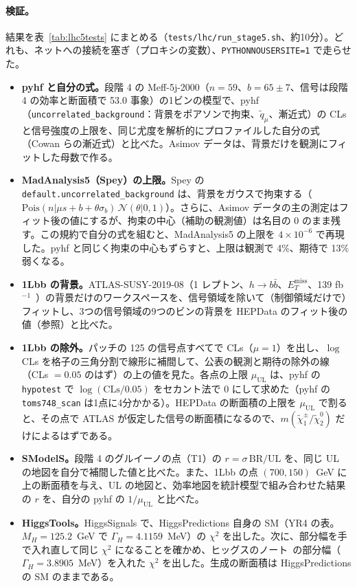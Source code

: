 \documentclass[a4paper,10pt]{ltjsarticle}
\begin{document}
\paragraph{検証。}結果を表~\ref{tab:lhc5tests} にまとめる（\nolinkurl{tests/lhc/run_stage5.sh}、約10分）。どれも、ネットへの接続を塞ぎ（プロキシの変数）、\texttt{PYTHONNOUSERSITE=1} で走らせた。
\begin{itemize}
\item \textbf{pyhf と自分の式。}段階 4 の Meff-5j-2000（$n=59$、$b=65\pm7$、信号は段階 4 の効率と断面積で 53.0 事象）の1ビンの模型で、pyhf（\texttt{uncorrelated\_background}：背景をポアソンで拘束、$\tilde q_\mu$、漸近式）の CLs と信号強度の上限を、同じ尤度を解析的にプロファイルした自分の式（Cowan らの漸近式）と比べた。Asimov データは、背景だけを観測にフィットした母数で作る。
\item \textbf{MadAnalysis5（Spey）の上限。}Spey の \texttt{default.uncorrelated\_background} は、背景をガウスで拘束する（$\mathrm{Pois}(n|\mu s+b+\theta\sigma_b)\,\mathcal N(\theta|0,1)$）。さらに、Asimov データの主の測定はフィット後の値にするが、拘束の中心（補助の観測値）は名目の 0 のまま残す。この規約で自分の式を組むと、MadAnalysis5 の上限を $4\times10^{-6}$ で再現した。pyhf と同じく拘束の中心もずらすと、上限は観測で 4\%、期待で 13\% 弱くなる。
\item \textbf{1Lbb の背景。}ATLAS-SUSY-2019-08（1 レプトン、$h\to b\bar b$、$E_T^{\mathrm{miss}}$、139 fb$^{-1}$~\cite{atlas1lbb}）の背景だけのワークスペースを、信号領域を除いて（制御領域だけで）フィットし、3つの信号領域の9つのビンの背景を HEPData のフィット後の値（参照）と比べた。
\item \textbf{1Lbb の除外。}パッチの 125 の信号点すべてで CLs（$\mu=1$）を出し、$\log$ CLs を格子の三角分割で線形に補間して、公表の観測と期待の除外の線（CLs $=0.05$ のはず）の上の値を見た。各点の上限 $\mu_{\mathrm{UL}}$ は、pyhf の \texttt{hypotest} で $\log(\mathrm{CLs}/0.05)$ をセカント法で 0 にして求めた（pyhf の \texttt{toms748\_scan} は1点に4分かかる）。HEPData の断面積の上限を $\mu_{\mathrm{UL}}$ で割ると、その点で ATLAS が仮定した信号の断面積になるので、$m(\tilde\chi^\pm_1/\tilde\chi^0_2)$ だけによるはずである。
\item \textbf{SModelS。}段階 4 のグルイーノの点（T1）の $r=\sigma\,\mathrm{BR}/\mathrm{UL}$ を、同じ UL の地図を自分で補間した値と比べた。また、1Lbb の点 $(700,150)$~GeV に上の断面積を与え、UL の地図と、効率地図を統計模型で組み合わせた結果の $r$ を、自分の pyhf の $1/\mu_{\mathrm{UL}}$ と比べた。
\item \textbf{HiggsTools。}HiggsSignals で、HiggsPredictions 自身の SM（YR4 の表。$M_H=125.2$~GeV で $\Gamma_H=4.1159$~MeV）の $\chi^2$ を出した。次に、部分幅を手で入れ直して同じ $\chi^2$ になることを確かめ、ヒッグスのノート~\cite{higgsnote}の部分幅（$\Gamma_H=3.8905$~MeV）を入れた $\chi^2$ を出した。生成の断面積は HiggsPredictions の SM のままである。
\end{itemize}
\end{document}
